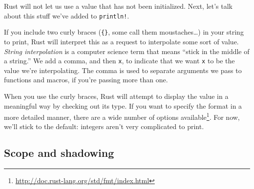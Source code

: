 \documentclass[a4paper,]{book}
\newenvironment{Shaded}{\begin{snugshade}}{\end{snugshade}}
\newcommand{\KeywordTok}[1]{\textcolor[rgb]{0.13,0.29,0.53}{\textbf{{#1}}}}
\newcommand{\StringTok}[1]{\textcolor[rgb]{0.31,0.60,0.02}{{#1}}}
\newcommand{\NormalTok}[1]{{#1}}
\renewcommand{\href}[2]{#2\footnote{\url{#1}}}
\begin{document}
\begin{Shaded}
\end{Shaded}

Rust will not let us use a value that has not been initialized. Next,
let's talk about this stuff we've added to \texttt{println!}.

If you include two curly braces (\texttt{\{\}}, some call them
moustaches\ldots{}) in your string to print, Rust will interpret this as
a request to interpolate some sort of value. \emph{String interpolation}
is a computer science term that means ``stick in the middle of a
string.'' We add a comma, and then \texttt{x}, to indicate that we want
\texttt{x} to be the value we're interpolating. The comma is used to
separate arguments we pass to functions and macros, if you're passing
more than one.

When you use the curly braces, Rust will attempt to display the value in
a meaningful way by checking out its type. If you want to specify the
format in a more detailed manner, there are a
\href{http://doc.rust-lang.org/std/fmt/index.html}{wide number of
options available}. For now, we'll stick to the default: integers aren't
very complicated to print.

\subsection{Scope and shadowing}\label{scope-and-shadowing}
\end{document}
